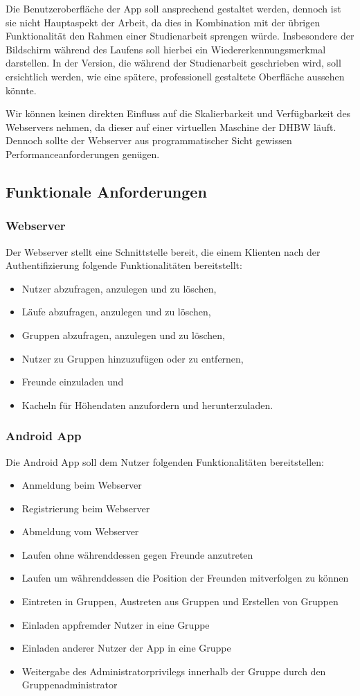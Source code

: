 Die Benutzeroberfläche der App soll ansprechend gestaltet werden, dennoch ist sie nicht Hauptaspekt der Arbeit, da dies in Kombination mit der übrigen Funktionalität den Rahmen einer Studienarbeit sprengen würde. Insbesondere der Bildschirm während des Laufens soll hierbei ein Wiedererkennungsmerkmal darstellen. In der Version, die während der Studienarbeit geschrieben wird, soll ersichtlich werden, wie eine spätere, professionell gestaltete Oberfläche aussehen könnte.

Wir können keinen direkten Einfluss auf die Skalierbarkeit und Verfügbarkeit des Webservers nehmen, da dieser auf einer virtuellen Maschine der DHBW läuft. Dennoch sollte der Webserver aus programmatischer Sicht gewissen Performanceanforderungen genügen.
\subsection{Funktionale Anforderungen}
\subsubsection{Webserver}
Der Webserver stellt eine Schnittstelle bereit, die einem Klienten nach der Authentifizierung folgende Funktionalitäten bereitstellt:
\begin{itemize}
\item Nutzer abzufragen, anzulegen und zu löschen,
\item Läufe abzufragen, anzulegen und zu löschen,
\item Gruppen abzufragen, anzulegen und zu löschen,
\item Nutzer zu Gruppen hinzuzufügen oder zu entfernen,
\item Freunde einzuladen und
\item Kacheln für Höhendaten anzufordern und herunterzuladen.
\end{itemize}
\subsubsection{Android App}
Die Android App soll dem Nutzer folgenden Funktionalitäten bereitstellen:
\begin{itemize}
\item Anmeldung beim Webserver
\item Registrierung beim Webserver
\item Abmeldung vom Webserver
\item Laufen ohne währenddessen gegen Freunde anzutreten
\item Laufen um währenddessen die Position der Freunden mitverfolgen zu können
\item Eintreten in Gruppen, Austreten aus Gruppen und Erstellen von Gruppen
\item Einladen appfremder Nutzer in eine Gruppe
\item Einladen anderer Nutzer der App in eine Gruppe
\item Weitergabe des Administratorprivilegs innerhalb der Gruppe durch den Gruppenadministrator
\end{itemize}
